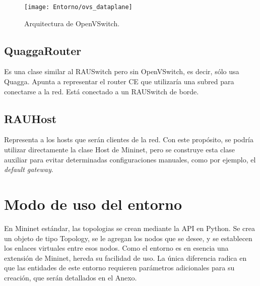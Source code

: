 \begin{figure}[t]
	\caption{Arquitectura de OpenVSwitch.}
	\texttt{[image: Entorno/ovs\_dataplane]}
	\centering
	\label{fig:ovs_dataplane}
\end{figure}

\subsection{QuaggaRouter}
Es una clase similar al RAUSwitch pero sin OpenVSwitch, es decir, sólo usa Quagga. Apunta a representar el router CE que utilizaría una subred para conectarse a la red. Está conectado a un RAUSwitch de borde.

\subsection{RAUHost}
Representa a los hosts que serán clientes de la red. Con este propósito, se podría utilizar directamente la clase Host de Mininet, pero se construye esta clase auxiliar para evitar determinadas configuraciones manuales, como por ejemplo, el \textit{default gateway}.


\section{Modo de uso del entorno}
En Mininet estándar, las topologias se crean mediante la API en Python. Se crea un objeto de tipo Topology, se le agregan los nodos que se desee, y se establecen los enlaces virtuales entre esos nodos. Como el entorno es en esencia una extensión de Mininet, hereda su facilidad de uso. La única diferencia radica en que las entidades de este entorno requieren parámetros adicionales para su creación, que serán detallados en el Anexo.
